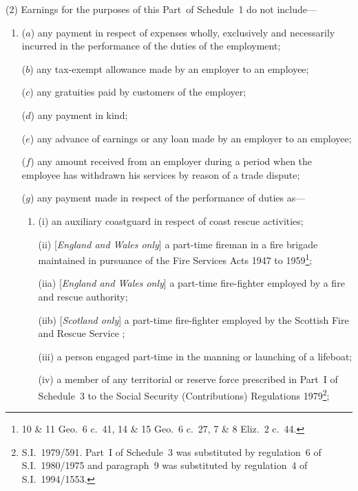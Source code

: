 \documentclass[12pt,a4paper]{article}
\begin{document}
(2) Earnings for the purposes of this Part~of Schedule~1 do not include—
\begin{enumerate}\item[]
($a$) any payment in respect of expenses wholly, exclusively and necessarily incurred in the performance of the duties of the employment;

($b$) any tax-exempt allowance made by an employer to an employee;

($c$) any gratuities paid by customers of the employer;

($d$) any payment in kind;

($e$) any advance of earnings or any loan made by an employer to an employee;

($f$) any amount received from an employer during a period when the employee has withdrawn his services by reason of a trade dispute;

($g$) any payment made in respect of the performance of duties as—
\begin{enumerate}\item[]
(i) an auxiliary coastguard in respect of coast rescue activities;

(ii) [\emph{England and Wales only}] a part-time fireman in a fire brigade maintained in pursuance of the Fire Services Acts 1947 to 1959\footnote{10 \& 11 Geo.\ 6 c.\ 41, 14 \& 15 Geo.\ 6 c.\ 27, 7 \& 8 Eliz.~2 c.\ 44.};

(iia) [\emph{England and Wales only}] a part-time fire-fighter employed by a fire and rescue authority;

(iib) [\emph{Scotland only}] a part-time fire-fighter employed by 
the Scottish Fire and Rescue Service%
;

(iii) a person engaged part-time in the manning or launching of a lifeboat;

(iv) a member of any territorial or reserve force prescribed in Part~I of Schedule~3 to the Social Security (Contributions) Regulations 1979\footnote{S.I.~1979/591. Part~I of Schedule~3 was substituted by regulation~6 of S.I.~1980/1975 and paragraph~9 was substituted by regulation~4 of S.I.~1994/1553.};
\end{enumerate}


\end{enumerate}
\end{document}
